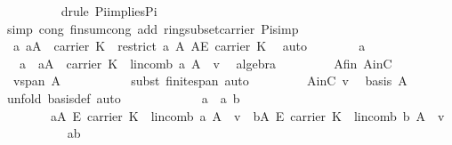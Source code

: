\begin{isabellebody}
\ \ \ \ \ \ \ \ \isamarkupfalse%
\ {\isacharparenleft}drule\ Pi{\isacharunderscore}implies{\isacharunderscore}Pi{}{\isacharparenright}\isanewline
\ \ \ \ \ \ \ \ \isamarkupfalse%
\ {\isacharparenleft}simp\ cong{\isacharcolon}\ finsum{\isacharunderscore}cong\ add{\isacharcolon}\ ring{\isacharunderscore}subset{\isacharunderscore}carrier\ Pi{\isacharunderscore}simp{\isacharparenright}\isanewline
\ \ \ \ \ \ \isamarkupfalse%
\ {}{\isacharcolon}\ {\isachardoublequoteopen}{\isasymAnd}a{\isachardot}\ a{\isasymin}A\ {\isasymrightarrow}\ carrier\ K\ {\isasymLongrightarrow}\ restrict\ a\ A{\isasymin}\ A{\isasymrightarrow}\isactrlsub E\ carrier\ K{\isachardoublequoteclose}\ \isamarkupfalse%
\ auto\isanewline
\ \ \ \ \ \ \isamarkupfalse%
\ a\ {}\ {}\ \isamarkupfalse%
\ {}{\isacharcolon}\ {\isachardoublequoteopen}{\isasymnot}{\isacharparenleft}{\isasymexists}\ a{\isachardot}\ \ a{\isasymin}A\ {\isasymrightarrow}\ carrier\ K\ {\isasymand}\ lincomb\ a\ A\ {\isacharequal}\ v{\isacharparenright}{\isachardoublequoteclose}\ \isamarkupfalse%
\ algebra\isanewline
\ \ \ \ \ \ \isamarkupfalse%
\ {}\ A{\isacharunderscore}fin\ AinC\ \isamarkupfalse%
\ {}{\isacharcolon}\ {\isachardoublequoteopen}v{\isasymnotin}span\ A{\isachardoublequoteclose}\ \isanewline
\ \ \ \ \ \ \ \ \isamarkupfalse%
\ {\isacharparenleft}subst\ finite{\isacharunderscore}span{\isacharcomma}\ auto{\isacharparenright}\isanewline
\ \ \ \ \ \ \isamarkupfalse%
\ {}\ AinC\ v\ \isamarkupfalse%
\ {\isachardoublequoteopen}{\isasymnot}{\isacharparenleft}basis\ A{\isacharparenright}{\isachardoublequoteclose}\ \isamarkupfalse%
\ {\isacharparenleft}unfold\ basis{\isacharunderscore}def{\isacharcomma}\ auto{\isacharparenright}\isanewline
\ \ \ \ \isamarkupfalse%
\isanewline
\ \ \ \ \ \ \isamarkupfalse%
\ a{}{\isacharcolon}\ {\isachardoublequoteopen}{\isacharparenleft}{\isasymexists}\ a\ b{\isachardot}\ \isanewline
\ \ \ \ \ \ \ \ a{\isasymin}A\ {\isasymrightarrow}\isactrlsub E\ carrier\ K\ {\isasymand}\ lincomb\ a\ A\ {\isacharequal}\ v\ {\isasymand}\ b{\isasymin}A\ {\isasymrightarrow}\isactrlsub E\ carrier\ K\ {\isasymand}\ lincomb\ b\ A\ {\isacharequal}\ v\ \isanewline
\ \ \ \ \ \ \ \ {\isasymand}\ a{\isasymnoteq}b{\isacharparenright}{\isachardoublequoteclose}\isanewline
\ \ \ \ \ \ \isamarkupfalse%

\end{isabellebody}
